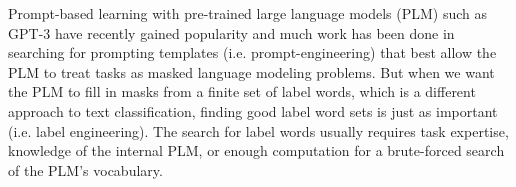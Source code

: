 


Prompt-based learning with pre-trained large language models (PLM) such as GPT-3 \citep{GPT3} have recently gained popularity and much work has been done in searching for prompting templates (i.e. prompt-engineering) \citep{Liu} that best allow the PLM to treat tasks as masked language modeling problems. But when we want the PLM to fill in masks from a finite set of label words, which is a different approach to text classification, finding good label word sets is just as important (i.e. label engineering). The search for label words usually requires task expertise, knowledge of the internal PLM, or enough computation for a brute-forced search of the PLM's vocabulary.

